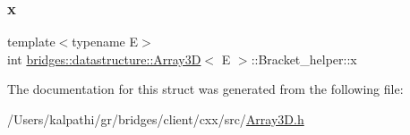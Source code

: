\subsubsection{\texorpdfstring{x}{x}}
{\footnotesize\ttfamily template$<$typename E$>$ \\
int \mbox{\hyperlink{classbridges_1_1datastructure_1_1_array3_d}{bridges\+::datastructure\+::\+Array3D}}$<$ E $>$\+::Bracket\+\_\+helper\+::x}



The documentation for this struct was generated from the following file\+:\begin{DoxyCompactItemize}
\item 
/\+Users/kalpathi/gr/bridges/client/cxx/src/\mbox{\hyperlink{_array3_d_8h}{Array3\+D.\+h}}\end{DoxyCompactItemize}
